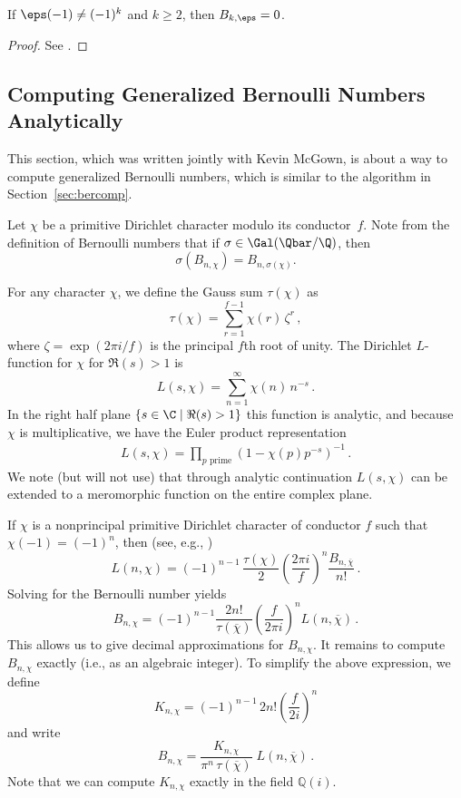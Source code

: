 \begin{proposition}
If $\eps(-1) \neq (-1)^k$ and $k\geq 2$, then $B_{k,\eps}=0$.
\end{proposition}
\begin{proof}
See .
\end{proof}

\subsection{Computing Generalized Bernoulli Numbers Analytically}\label{sec:genber}
\mbox{}\newline

This section, which was written jointly with Kevin McGown,
is about a way to compute generalized
Bernoulli numbers, which is similar to the algorithm
in Section~\ref{sec:bercomp}.

Let $\chi$ be a primitive Dirichlet character
modulo its conductor~$f$. 
Note from the definition of Bernoulli numbers that
if $\sigma\in\Gal(\Qbar/\Q)$, then 
\begin{equation}\label{eqn:galois_act_chi}
\sigma(B_{n,\chi}) =  B_{n,\sigma(\chi)}.
\end{equation}

For any character $\chi$, we define the Gauss sum $\tau(\chi)$ as
$$
  \tau(\chi)=\sum_{r=1}^{f-1} \chi(r)\,\zeta^r
  \,,
$$
where $\zeta=\exp(2\pi i/f)$ is the principal $f$th root of unity.
The Dirichlet $L$-function for $\chi$ for $\Re(s)>1$ is
$$
  L(s,\chi)=\sum_{n=1}^\infty \chi(n)\,n^{-s}
  \,.
$$
In the right half plane $\{s\in\C\mid \Re(s)>1\}$
this function is analytic, and because~$\chi$ is
multiplicative, we have the Euler product representation
\begin{align}\label{eqn:direp}
  L(s,\chi)=\prod_{p \text{ prime}} \left(1-\chi(p) p^{-s}\right)^{-1}
  \,.
\end{align}
We note (but will not use) that through analytic continuation $L(s,\chi)$
can be extended to a meromorphic function on the entire complex plane.

If $\chi$ is a nonprincipal primitive Dirichlet character of
conductor $f$ such that $\chi(-1)=(-1)^n$, then (see, e.g.,
\cite{wangkai})
$$
  L(n,\chi)=(-1)^{n-1}\, \frac{\tau(\chi)}{2} \left(\frac{2\pi i}{f}\right)^n
  \frac{B_{n,\overline{\chi}}}{n!}
  \,.
$$
Solving for the Bernoulli number yields
$$
  B_{n,\chi}=(-1)^{n-1}\frac{2 n!}{\tau(\overline{\chi})}\left(\frac{f}{2\pi i}\right)^n
  L(n,\overline{\chi})
  \,.
$$
This allows us to give decimal approximations for $B_{n,\chi}$.
It remains to compute $B_{n,\chi}$ exactly (i.e., as an algebraic integer).
To simplify the above expression, we define
$$
  K_{n,\chi} =(-1)^{n-1}\, 2 n!\left(\frac{f}{2 i}\right)^n
$$
and write
\begin{equation}\label{eqn:bnchi}
  B_{n,\chi}=\frac{K_{n,\chi}}{\pi^n\,\tau(\overline{\chi})}\;
  L(n,\overline{\chi})
  \,.
\end{equation}
Note that we can compute $K_{n,\chi}$ exactly in the field
$\mathbb{Q}(i)$.

